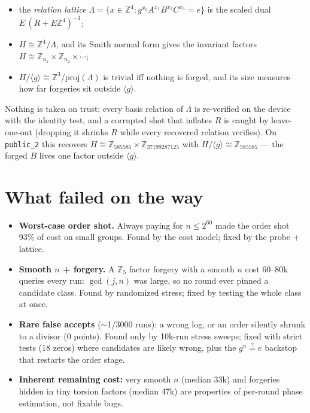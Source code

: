 \documentclass[11pt]{article}
\newcommand{\Z}{\mathbb{Z}}
\theoremstyle{plain}
\theoremstyle{definition}
\begin{document}
\begin{itemize}[nosep]
  \item the \emph{relation lattice}
        $\Lambda=\{x\in\Z^4 : g^{x_0}A^{x_1}B^{x_2}C^{x_3}=e\}$
        is the scaled dual $E\,(R+E\Z^4)^{-1}$;
  \item $H\cong\Z^4/\Lambda$, and its Smith normal form gives the
        invariant factors $H\cong\Z_{n_1}\times\Z_{n_2}\times\cdots$;
  \item $H/\langle g\rangle\cong\Z^3/\mathrm{proj}(\Lambda)$ is trivial
        iff nothing is forged, and its size measures how far forgeries
        sit outside $\langle g\rangle$.
\end{itemize}

Nothing is taken on trust: every basis relation of $\Lambda$ is
re-verified on the device with the identity test, and a corrupted shot
that inflates $R$ is caught by leave-one-out (dropping it shrinks $R$
while every recovered relation verifies). On \texttt{public\_2} this
recovers $H\cong\Z_{585585}\times\Z_{37199287125}$ with
$H/\langle g\rangle\cong\Z_{585585}$ --- the forged $B$ lives one factor
outside $\langle g\rangle$.

\section{What failed on the way}

\begin{itemize}[nosep]
  \item \textbf{Worst-case order shot.} Always paying for $n\le2^{60}$
        made the order shot 93\% of cost on small groups. Found by the
        cost model; fixed by the probe + lattice.
  \item \textbf{Smooth $n$ + forgery.} A $\Z_5$ factor forgery with a
        smooth $n$ cost 60--80k queries every run: $\gcd(j,n)$ was large,
        so no round ever pinned a candidate class. Found by randomized
        stress; fixed by testing the whole class at once.
  \item \textbf{Rare false accepts} ($\sim$1/3000 runs): a wrong log, or
        an order silently shrunk to a divisor (0 points). Found only by
        10k-run stress sweeps; fixed with strict tests (18 zeros) where
        candidates are likely wrong, plus the $g^n\stackrel?=e$
        backstop that restarts the order stage.
  \item \textbf{Inherent remaining cost:} very smooth $n$ (median 33k)
        and forgeries hidden in tiny torsion factors (median 47k) are
        properties of per-round phase estimation, not fixable bugs.
\end{itemize}
\end{document}

